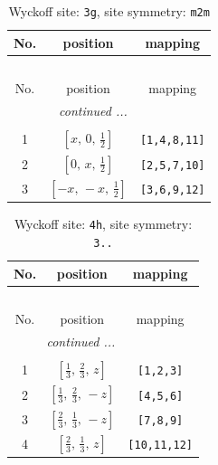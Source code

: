 \documentclass[fleqn,8pt]{jsarticle}
\begin{document}
\begin{longtable}{ccc}
\caption{Wyckoff site: {\tt 3g}, site symmetry: {\tt m2m}}
 \\
 \hline \hline
No. & position & mapping \\ \hline \endfirsthead

\multicolumn{2}{l}{\tablename\ \thetable{}} \\
 \hline \hline
No. & position & mapping \\ \hline \endhead

 \hline \hline
\multicolumn{2}{r}{\footnotesize\it continued ...} \\ \endfoot

 \hline \hline
\multicolumn{2}{r}{} \\ \endlastfoot

1 & $\left[ x,\, 0,\, \frac{1}{2} \right]$ & {\tt [1,4,8,11]} \\ \hline
2 & $\left[ 0,\, x,\, \frac{1}{2} \right]$ & {\tt [2,5,7,10]} \\ \hline
3 & $\left[ - x,\, - x,\, \frac{1}{2} \right]$ & {\tt [3,6,9,12]} \\
\end{longtable}
\renewcommand{\arraystretch}{1.2}
\begin{longtable}{ccc}
\caption{Wyckoff site: {\tt 4h}, site symmetry: {\tt 3..}}
 \\
 \hline \hline
No. & position & mapping \\ \hline \endfirsthead

\multicolumn{2}{l}{\tablename\ \thetable{}} \\
 \hline \hline
No. & position & mapping \\ \hline \endhead

 \hline \hline
\multicolumn{2}{r}{\footnotesize\it continued ...} \\ \endfoot

 \hline \hline
\multicolumn{2}{r}{} \\ \endlastfoot

1 & $\left[ \frac{1}{3},\, \frac{2}{3},\, z \right]$ & {\tt [1,2,3]} \\ \hline
2 & $\left[ \frac{1}{3},\, \frac{2}{3},\, - z \right]$ & {\tt [4,5,6]} \\ \hline
3 & $\left[ \frac{2}{3},\, \frac{1}{3},\, - z \right]$ & {\tt [7,8,9]} \\ \hline
4 & $\left[ \frac{2}{3},\, \frac{1}{3},\, z \right]$ & {\tt [10,11,12]} \\
\end{longtable}
\end{document}
